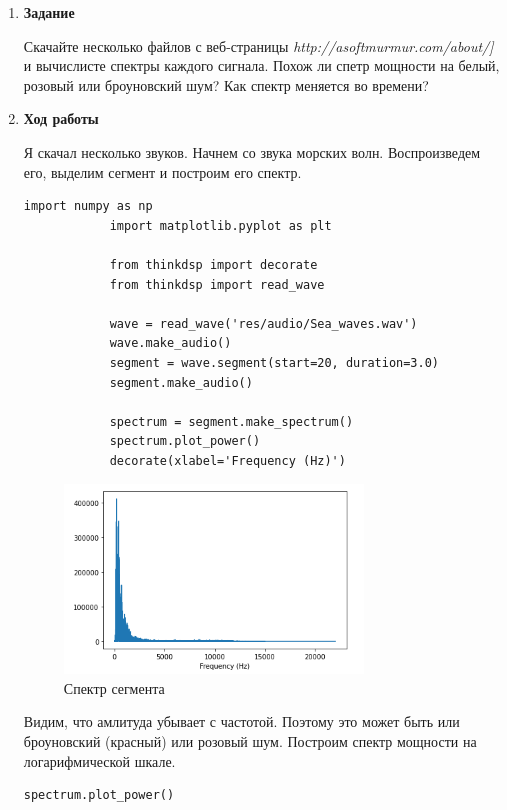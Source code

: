 \documentclass[a4paper,12pt]{article}
\begin{document}
	\begin{enumerate}
		
		\item \textbf{Задание}
		
		Скачайте несколько файлов с веб-страницы \textit{http://asoftmurmur.com/about/]} и вычислисте спектры каждого сигнала. Похож ли спетр мощности на белый, розовый или броуновский шум? Как спектр меняется во времени?
		
		\item \textbf{Ход работы}
		
		Я скачал несколько звуков. Начнем со звука морских волн. Воспроизведем его, выделим сегмент и построим его спектр. 
		\begin{lstlisting}[caption=Работа со звуком морских волн]
			import numpy as np
			import matplotlib.pyplot as plt
		
			from thinkdsp import decorate
			from thinkdsp import read_wave
			
			wave = read_wave('res/audio/Sea_waves.wav')
			wave.make_audio()
			segment = wave.segment(start=20, duration=3.0)
			segment.make_audio()
			
			spectrum = segment.make_spectrum()
			spectrum.plot_power()
			decorate(xlabel='Frequency (Hz)')
		\end{lstlisting}
		\begin{figure}[H]
			\centering
			\includegraphics[width=0.75\textwidth]{1_1.png}
			\caption{Спектр сегмента}
			\label{fig:1.1}
		\end{figure}
		
		Видим, что амлитуда убывает с частотой. Поэтому это может быть или броуновский (красный) или розовый шум. Построим спектр мощности на логарифмической шкале.
		
		\begin{lstlisting}[caption=Спектр мощности]
			spectrum.plot_power()
			

\end{lstlisting}
\end{enumerate}
\end{document}
